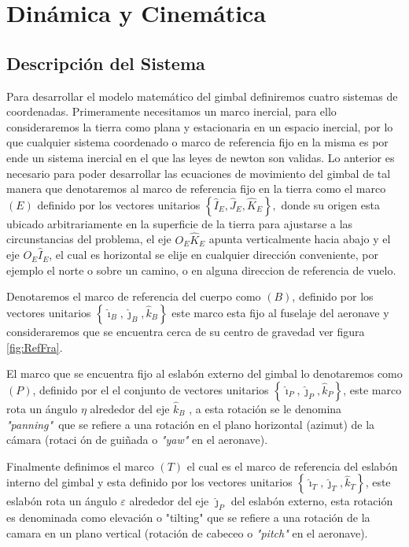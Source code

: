 \chapter{Din\'{a}mica y Cinem\'{a}tica}\label{sec:Modelado}

\section{Descripci\'{o}n del Sistema}\label{sec:desdelsist}



Para desarrollar el modelo matem\'{a}tico del gimbal definiremos cuatro sistemas de coordenadas. Primeramente necesitamos un marco inercial,
para ello consideraremos la tierra como plana y estacionaria en un espacio
inercial, por lo que cualquier sistema coordenado o marco de referencia fijo en la misma es por ende un sistema inercial en el que las
leyes de newton son validas. Lo anterior es necesario para poder desarrollar
las ecuaciones de movimiento del gimbal de tal manera que denotaremos al
marco de referencia fijo en la tierra como el marco $\left( E\right) $
definido por los vectores unitarios $\left\{ \hat{I}_{E},\hat{J}_{E},%
\hat{K}_{E}\right\} ,$ donde su origen esta ubicado arbitrariamente en
la superficie de la tierra para ajustarse a las circunstancias del problema,
el eje $O_{E}\hat{K}_{E}$ apunta verticalmente hacia abajo y el eje $%
O_{E}\hat{I}_{E}$, el cual es horizontal se elije en cualquier direcci\'{o}n
conveniente, por ejemplo el norte o sobre un camino, o en alguna direccion
de referencia de vuelo.

Denotaremos el marco de referencia del cuerpo como $\left( B\right) $,
definido por los vectores unitarios $\left\{ \hat{\imath}_{B},\hat{\jmath}%
_{B},\hat{k}_{B}\right\} $ este marco esta fijo al fuselaje del aeronave
y consideraremos que se encuentra cerca de su centro de gravedad ver figura \ref{fig:RefFra}.

El marco que se encuentra fijo al eslab\'{o}n externo del gimbal lo
denotaremos como $\left( P\right) $, definido por el el conjunto de vectores
unitarios $\left\{ \hat{\imath}_{P},\hat{\jmath}_{P},\hat{k}_{P}\right\} 
$, este marco rota un \'{a}ngulo $ \eta $ alrededor del eje $\hat{k}_{B}$%
, a esta rotaci\'{o}n se le denomina \textit{"panning"}\ que se refiere a
una rotaci\'{o}n en el plano horizontal (azimut) de la c\'{a}mara (rotaci%
\'{o}n de gui\~{n}ada o \textit{"yaw"} en el aeronave).

Finalmente definimos el marco $\left( T\right) $ el cual es el marco de
referencia del eslab\'{o}n interno del gimbal y esta definido por los
vectores unitarios $\left\{ \hat{\imath}_{T},\hat{\jmath}_{T},\hat{k}%
_{T}\right\} $, este eslab\'{o}n rota un \'{a}ngulo $\varepsilon $ alrededor
del eje $\hat{\jmath}_{P}$ del eslab\'{o}n externo, esta rotaci\'{o}n es
denominada como elevaci\'{o}n o "tilting" que se refiere a una rotaci\'{o}n
de la camara en un plano vertical (rotaci\'{o}n de cabeceo o \textit{"pitch"}
en el aeronave).

